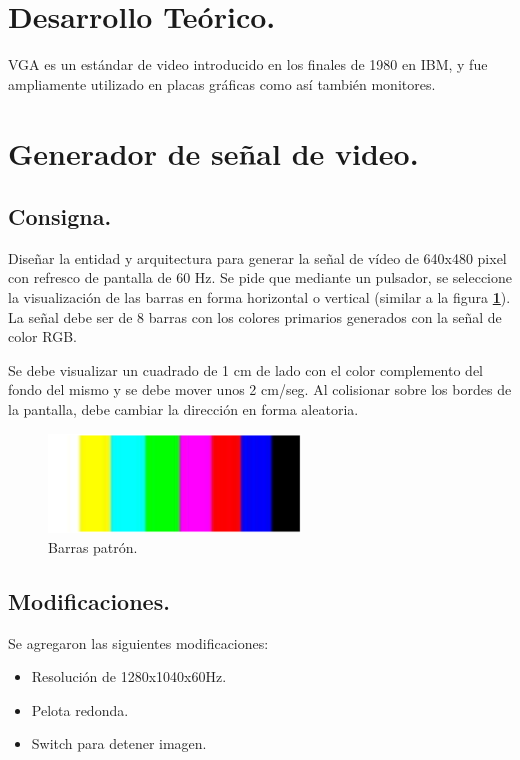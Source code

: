 \documentclass[11pt, a4paper]{article}
\begin{document}
\section{Desarrollo Teórico.}
	VGA es un estándar de video introducido en los finales de 1980 en IBM, y fue ampliamente utilizado en placas gráficas como así también monitores. 

	

\section{Generador de señal de video.}

	\subsection{Consigna.}
		Diseñar la entidad y arquitectura para generar la señal de vídeo de 640x480 pixel con refresco de pantalla de 60 Hz. Se pide que mediante un pulsador, se seleccione la visualización de las barras en forma horizontal o vertical (similar a la figura \textcolor{blue}{\textbf{\ref{fig:barras}}}). La señal debe ser de 8 barras con los colores primarios generados con la señal de color RGB.

		Se debe visualizar un cuadrado de 1 cm de lado con el color complemento del fondo del mismo y se debe mover unos 2 cm/seg. Al colisionar sobre los bordes de la pantalla, debe cambiar la dirección en forma aleatoria.

	\begin{figure}[H]
		\centering
		\includegraphics[width=0.6\textwidth]{Imagenes/barras.png}
		\caption{Barras patrón.}
		\label{fig:barras}
	\end{figure} 

	\subsection{Modificaciones.}
		Se agregaron las siguientes modificaciones:
		\begin{itemize}
			\item Resolución de 1280x1040x60Hz.
			\item Pelota redonda.
			\item Switch para detener imagen.
		\end{itemize}
\end{document}
